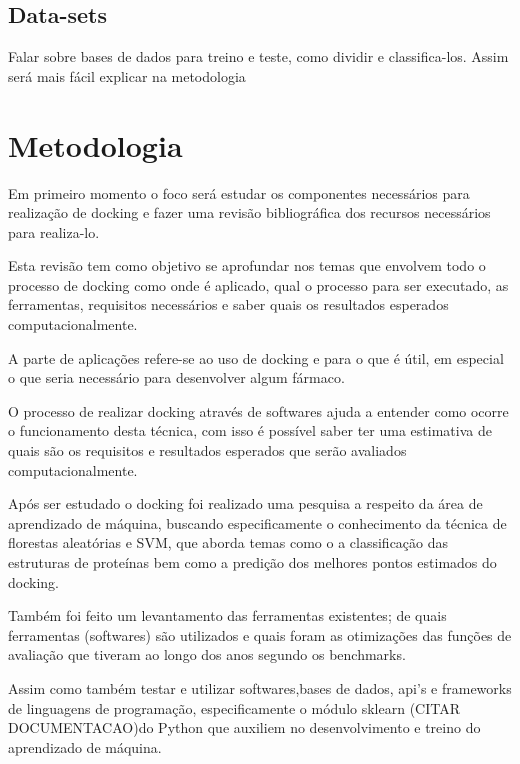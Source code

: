 \documentclass[tcc, capa]{texucpel}
\begin{document}

\section{Data-sets}

Falar sobre bases de dados para treino e teste, como dividir e classifica-los. Assim será mais fácil explicar na metodologia

\chapter{Metodologia}
Em primeiro momento o foco será estudar os componentes necessários para realização de docking e  fazer uma revisão bibliográfica dos recursos necessários para realiza-lo.

Esta revisão tem como objetivo se aprofundar nos temas que envolvem todo o processo de docking como onde é aplicado, qual o processo para ser executado, as ferramentas, requisitos necessários  e saber quais os resultados esperados computacionalmente.

A parte de aplicações refere-se ao uso de docking e para o que é útil,  em especial o que seria necessário para desenvolver algum fármaco.

O processo de realizar docking através de softwares ajuda a entender como ocorre o funcionamento desta técnica, com isso é possível saber ter uma estimativa de quais são os requisitos e resultados esperados que serão avaliados computacionalmente.

Após ser estudado o docking foi realizado uma pesquisa a respeito da área de aprendizado de máquina, buscando especificamente o conhecimento da técnica de florestas aleatórias e SVM, que aborda temas como o a classificação das estruturas de proteínas bem como a predição dos melhores pontos estimados do docking.

Também foi feito um levantamento das ferramentas existentes; de quais ferramentas (softwares) são utilizados e quais foram as otimizações das funções de avaliação que tiveram ao longo dos anos segundo os benchmarks.

Assim como também testar e utilizar softwares,bases de dados, api's e frameworks de linguagens de programação, especificamente o módulo sklearn (CITAR DOCUMENTACAO)do Python que auxiliem no desenvolvimento e treino do aprendizado de máquina.
\end{document}
